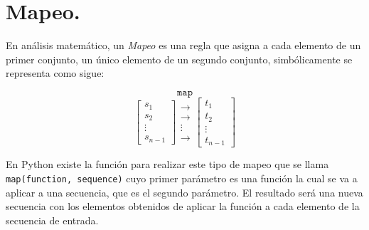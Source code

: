 \documentclass[
  spanish,
  letterpaper,
]{scrbook}
\theoremstyle{definition}
\theoremstyle{remark}
\begin{document}
\section{Mapeo.}\label{mapeo.}

En análisis matemático, un \emph{Mapeo} es una regla que asigna a cada
elemento de un primer conjunto, un único elemento de un segundo
conjunto, simbólicamente se representa como sigue:

\[
\texttt{map} 
\] \[
\left[
\begin{matrix}
s_1 \\
s_2 \\
\vdots \\
s_{n-1}
\end{matrix}
\right]
\begin{matrix}
\longrightarrow \\
\longrightarrow \\
\vdots \\
\longrightarrow
\end{matrix}
\left[
\begin{matrix}
t_1 \\
t_2 \\
\vdots \\
t_{n-1}
\end{matrix}
\right]
\]

En Python existe la función para realizar este tipo de mapeo que se
llama \texttt{map(function,\ sequence)} cuyo primer parámetro es una
función la cual se va a aplicar a una secuencia, que es el segundo
parámetro. El resultado será una nueva secuencia con los elementos
obtenidos de aplicar la función a cada elemento de la secuencia de
entrada.
\end{document}
